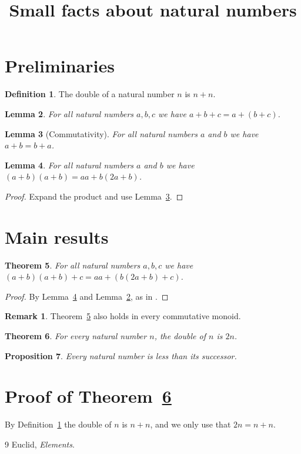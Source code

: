 \documentclass{amsart}
\title{Small facts about natural numbers}
\newtheorem{theorem}{Theorem}[section]
\newtheorem{lemma}[theorem]{Lemma}
\newtheorem{proposition}[theorem]{Proposition}
\theoremstyle{definition}
\newtheorem{definition}[theorem]{Definition}
\newtheorem*{remark}{Remark}
\begin{document}
\maketitle

\section{Preliminaries}

\begin{definition}\label{def:double}
The double of a natural number $n$ is $n + n$.
\end{definition}

\begin{lemma}\label{lem:assoc}
For all natural numbers $a, b, c$ we have $a + b + c = a + (b + c)$.
\end{lemma}

\begin{lemma}[Commutativity]\label{lem:comm}
For all natural numbers $a$ and $b$ we have $a + b = b + a$.
\end{lemma}

\begin{lemma}\label{lem:square}
For all natural numbers $a$ and $b$ we have $(a + b)(a + b) = a a + b (2 a + b)$.
\end{lemma}
\begin{proof}
Expand the product and use Lemma~\ref{lem:comm}.
\end{proof}

\section{Main results}

\begin{theorem}\label{thm:main}
For all natural numbers $a, b, c$ we have $(a + b)(a + b) + c = a a + (b (2 a + b) + c)$.
\end{theorem}
\begin{proof}
By Lemma~\ref{lem:square} and Lemma~\ref{lem:assoc}, as in \cite{euclid}.
\end{proof}

\begin{remark}
Theorem~\ref{thm:main} also holds in every commutative monoid.
\end{remark}

\begin{theorem}\label{thm:late}
For every natural number $n$, the double of $n$ is $2 n$.
\end{theorem}

\begin{proposition}\label{prop:alone}
Every natural number is less than its successor.
\end{proposition}

\section{Proof of Theorem~\ref{thm:late}}
By Definition~\ref{def:double} the double of $n$ is $n + n$, and we only use that $2 n = n + n$.

\begin{thebibliography}{9}
 Euclid, \emph{Elements}.
\end{thebibliography}
\end{document}
